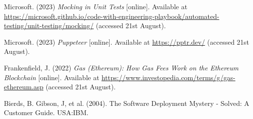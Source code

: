  \noindent [TODO5] Microsoft. (2023) \textit{Mocking in Unit Tests} [online]. Available at \url{https://microsoft.github.io/code-with-engineering-playbook/automated-testing/unit-testing/mocking/} (accessed 21st August).
 \vspace{0.2cm}

 \noindent [TODO6] Microsoft. (2023) \textit{Puppeteer} [online]. Available at \url{https://pptr.dev/} (accessed 21st August).
 \vspace{0.2cm}

 \noindent [TODO7] Frankenfield, J. (2022) \textit{Gas (Ethereum): How Gas Fees Work on the Ethereum Blockchain} [online]. Available at \url{https://www.investopedia.com/terms/g/gas-ethereum.asp} (accessed 21st August).
 \vspace{0.2cm}

 \noindent [TODO8] Bierds, B. Gibson, J, et al. (2004). The Software Deployment Mystery - Solved: A Customer Guide. USA:IBM.
 \vspace{0.2cm}

\newpage
